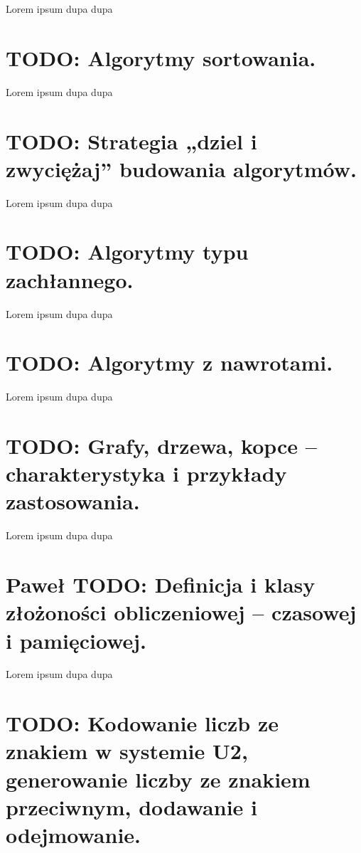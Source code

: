 \documentclass[a4paper,12pt,oneside]{book}
\begin{document}
		    Lorem ipsum dupa dupa
		
		\setcounter{section}{17}
		\section{\color{red} TODO: Algorytmy sortowania. }
		    
		    Lorem ipsum dupa dupa
		
		
		\setcounter{section}{18}
		\section{\color{red} TODO: Strategia „dziel i zwyciężaj” budowania algorytmów. }
		    
		    Lorem ipsum dupa dupa
		
		\setcounter{section}{19}
		\section{\color{red} TODO: Algorytmy typu zachłannego. }
		    
		    Lorem ipsum dupa dupa
		
		\setcounter{section}{20}
		\section{\color{red} TODO: Algorytmy z nawrotami. }
		    
		    Lorem ipsum dupa dupa
		
		\setcounter{section}{21}
		\section{\color{red} TODO: Grafy, drzewa, kopce – charakterystyka i przykłady zastosowania. }
		    
		    Lorem ipsum dupa dupa
		
		\setcounter{section}{46}
		\section{\color{green}Paweł \color{red} TODO: Definicja i klasy złożoności obliczeniowej – czasowej i pamięciowej. }
		    
		    Lorem ipsum dupa dupa
		
		\setcounter{section}{55}
		\section{\color{red} TODO: Kodowanie liczb ze znakiem w systemie U2, generowanie liczby ze znakiem przeciwnym, dodawanie i odejmowanie. }
		    
\end{document}
